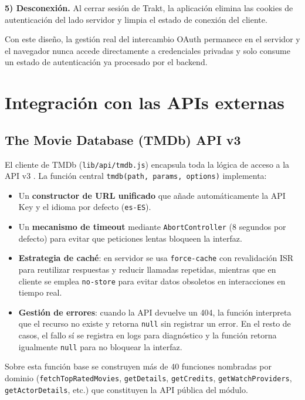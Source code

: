 \textbf{5) Desconexión.} Al cerrar sesión de Trakt, la aplicación elimina las cookies de autenticación del lado servidor y limpia el estado de conexión del cliente.

Con este diseño, la gestión real del intercambio OAuth permanece en el servidor y el navegador nunca accede directamente a credenciales privadas y solo consume un estado de autenticación ya procesado por el backend.

\section{Integración con las APIs externas}

\subsection{The Movie Database (TMDb) API v3}

El cliente de TMDb (\texttt{lib/api/tmdb.js}) encapsula toda la lógica de acceso a la API v3 \parencite{TMDb:2024}. La función central \texttt{tmdb(path, params, options)} implementa:

\begin{itemize}
\item Un \textbf{constructor de URL unificado} que añade automáticamente la API Key y el idioma por defecto (\texttt{es-ES}).
\item Un \textbf{mecanismo de timeout} mediante \texttt{AbortController} (8 segundos por defecto) para evitar que peticiones lentas bloqueen la interfaz.
\item \textbf{Estrategia de caché}: en servidor se usa \texttt{force-cache} con revalidación ISR \parencite{Vercel:2024c} para reutilizar respuestas y reducir llamadas repetidas, mientras que en cliente se emplea \texttt{no-store} para evitar datos obsoletos en interacciones en tiempo real.
\item \textbf{Gestión de errores}: cuando la API devuelve un 404, la función interpreta que el recurso no existe y retorna \texttt{null} sin registrar un error. En el resto de casos, el fallo sí se registra en logs para diagnóstico y la función retorna igualmente \texttt{null} para no bloquear la interfaz.
\end{itemize}

Sobre esta función base se construyen más de 40 funciones nombradas por dominio (\texttt{fetchTopRatedMovies}, \texttt{getDetails}, \texttt{getCredits}, \texttt{getWatchProviders}, \texttt{getActorDetails}, etc.) que constituyen la API pública del módulo.


